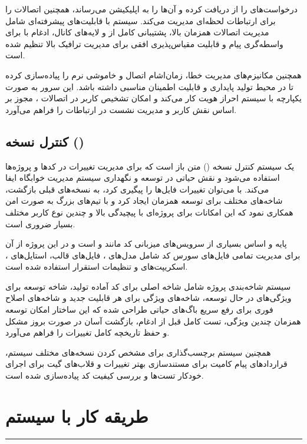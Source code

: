 \documentclass[12pt,a4paper]{report}
\begin{document}
	 درخواست‌های  را از  دریافت کرده و آن‌ها را به اپلیکیشن  می‌رساند، همچنین اتصالات  را برای ارتباطات لحظه‌ای مدیریت می‌کند. سیستم با قابلیت‌های پیشرفته‌ای شامل مدیریت اتصالات همزمان بالا، پشتیبانی کامل از  و لایه‌های کانال، ادغام با  برای واسطه‌گری پیام و قابلیت مقیاس‌پذیری افقی برای مدیریت ترافیک بالا تنظیم شده است.
	
	 همچنین مکانیزم‌های مدیریت خطا، زمان‌اشام اتصال و خاموشی نرم را پیاده‌سازی کرده تا در محیط تولید پایداری و قابلیت اطمینان مناسبی داشته باشد. این سرور به صورت یکپارچه با سیستم احراز هویت  کار می‌کند و امکان تشخیص کاربر در اتصالات ، مجوز بر اساس نقش کاربر و مدیریت نشست در ارتباطات  را فراهم می‌آورد.
	
	\section{کنترل نسخه ()}
	 یک سیستم کنترل نسخه () متن باز است که برای مدیریت تغییرات در کدها و پروژه‌ها استفاده می‌شود و نقش حیاتی در توسعه و نگهداری سیستم مدیریت خوابگاه ایفا می‌کند. با  می‌توان تغییرات فایل‌ها را پیگیری کرد، به نسخه‌های قبلی بازگشت، شاخه‌های مختلف برای توسعه همزمان ایجاد کرد و با تیم‌های بزرگ به صورت امن همکاری نمود که این امکانات برای پروژه‌ای با پیچیدگی بالا و چندین نوع کاربر مختلف بسیار ضروری است.
	
	 پایه و اساس بسیاری از سرویس‌های میزبانی کد مانند  و  است و در این پروژه از آن برای مدیریت تمامی فایل‌های سورس کد شامل مدل‌های ، فایل‌های قالب، استایل‌های ، اسکریپت‌های  و تنظیمات استقرار استفاده شده است.
	
	سیستم شاخه‌بندی پروژه شامل شاخه اصلی برای کد آماده تولید، شاخه توسعه برای ویژگی‌های در حال توسعه، شاخه‌های ویژگی برای هر قابلیت جدید و شاخه‌های اصلاح فوری برای رفع سریع باگ‌های حیاتی طراحی شده که این ساختار امکان توسعه همزمان چندین ویژگی، تست کامل قبل از ادغام، بازگشت آسان در صورت بروز مشکل و حفظ تاریخچه کامل تغییرات را فراهم می‌آورد.
	
	همچنین سیستم برچسب‌گذاری برای مشخص کردن نسخه‌های مختلف سیستم، قراردادهای پیام کامیت برای مستندسازی بهتر تغییرات و قلاب‌های گیت برای اجرای خودکار تست‌ها و بررسی کیفیت کد پیاده‌سازی شده است.
	
	
	\chapter{طریقه کار با سیستم}
	\vspace{-2.5\baselineskip}
	\noindent\rule{\textwidth}{0.4pt}
	
\end{document}
